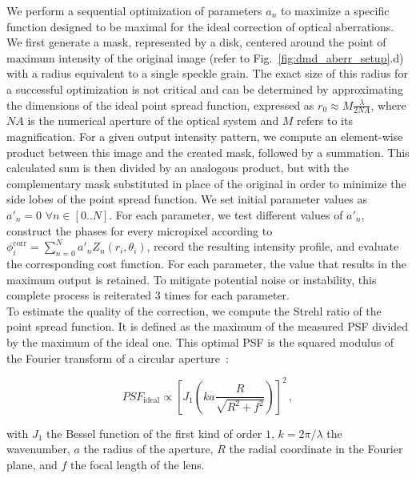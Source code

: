 \documentclass[12pt]{iopart}
\begin{document}
We perform a sequential optimization of parameters $a_n$
to maximize a specific function designed
to be maximal for the ideal correction of optical aberrations.
We first  generate a mask, represented by a disk,
centered around the point of maximum intensity of the original image (refer to Fig.~\ref{fig:dmd_aberr_setup}.d)
with a radius equivalent to a single speckle grain.
The exact size of this radius for a successful optimization is not critical
and can be determined by approximating the dimensions of the ideal point spread function,
expressed as $r_0 \approx M \frac{\lambda}{2 NA}$,
where $NA$ is the numerical aperture of the optical system and $M$ refers to its magnification.
For a given output intensity pattern, we compute an element-wise product between this image
and the created mask, followed by a summation.
This calculated sum is then divided by an analogous product, but with the complementary mask substituted in place of the original
in order to minimize the side lobes of the point spread function.
We set initial parameter values as $a'_n = 0\,\, \forall n \in [0..N]$.
For each parameter, we test different values of $a'_n$,
construct the phases for every micropixel according to
$\phi_i^\text{corr} = \sum_{n=0}^N a'_n Z_n(r_i,\theta_i)$,
record the resulting intensity profile,
and evaluate the corresponding cost function.
For each parameter, the value that results in the maximum output is retained.
To mitigate potential noise or instability, this complete process is reiterated $3$ times for each parameter.\\


To estimate the quality of the correction,
we compute the Strehl ratio of the point spread function.
It is defined as the maximum of the measured PSF divided
by the maximum of the ideal one.
This optimal PSF is
the  squared modulus of the Fourier transform of a circular aperture~\cite{airy1835diffraction}:

\begin{equation}
  PSF_\text{ideal} \propto
  \left[
    J_1\left(k a \frac{R}{\sqrt{R^2+f^2}}\right)
    \right]^2 \, ,
\end{equation}

with $J_1$ the Bessel function of the first kind of order $1$,
$k = 2\pi/\lambda$ the wavenumber,
$a$ the radius of the aperture,
$R$ the radial coordinate in the Fourier plane,
and $f$ the focal length of the lens.\\
\end{document}
